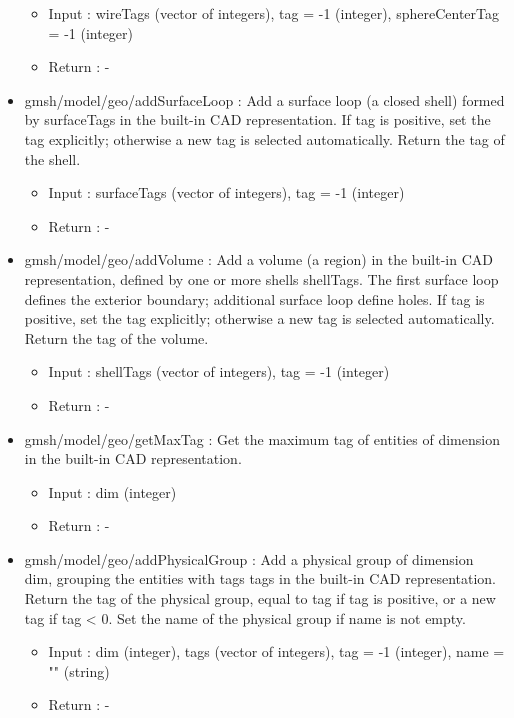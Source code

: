 \documentclass[dvipdfmx, 9pt, a4paper]{article}
\numberwithin{equation}{section}
\begin{document}
\begin{itemize}
\begin{itemize}
\item Input : wireTags (vector of integers), tag = -1 (integer), sphereCenterTag = -1 (integer)
\item Return : -
\end{itemize}
\item gmsh/model/geo/addSurfaceLoop : Add a surface loop (a closed shell) formed by surfaceTags in the built-in CAD representation. If tag is positive, set the tag explicitly; otherwise a new tag is selected automatically. Return the tag of the shell.
\begin{itemize}
\item Input : surfaceTags (vector of integers), tag = -1 (integer)
\item Return : -
\end{itemize}
\item gmsh/model/geo/addVolume : Add a volume (a region) in the built-in CAD representation, defined by one or more shells shellTags. The first surface loop defines the exterior boundary; additional surface loop define holes. If tag is positive, set the tag explicitly; otherwise a new tag is selected automatically. Return the tag of the volume.
\begin{itemize}
\item Input : shellTags (vector of integers), tag = -1 (integer)
\item Return : -
\end{itemize}
\item gmsh/model/geo/getMaxTag : Get the maximum tag of entities of dimension in the built-in CAD representation.
\begin{itemize}
\item Input : dim (integer)
\item Return : -
\end{itemize}
\item gmsh/model/geo/addPhysicalGroup : Add a physical group of dimension dim, grouping the entities with tags tags in the built-in CAD representation. Return the tag of the physical group, equal to tag if tag is positive, or a new tag if tag < 0. Set the name of the physical group if name is not empty.
\begin{itemize}
\item Input : dim (integer), tags (vector of integers), tag = -1 (integer), name = "" (string)
\item Return : -
\end{itemize}
\end{itemize}
\end{document}
